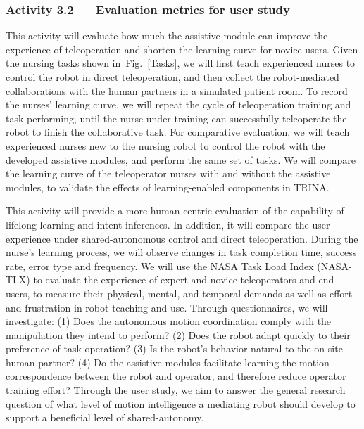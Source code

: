 \documentclass[letterpaper, 11 pt, onecolumn]{article}
\newcommand{\fig}[1]{Fig.~\ref{#1}}
\begin{document}
\subsubsection{Activity 3.2 --- Evaluation metrics for user study}\label{sec:plan-implementation-userstudy}
This activity will evaluate how much the assistive module can improve the experience of teleoperation and shorten the learning curve for novice users. Given the nursing tasks shown in~\fig{Tasks}, we will first teach experienced nurses to control the robot in direct teleoperation, and then collect the robot-mediated collaborations with the human partners in a simulated patient room. To record the nurses' learning curve, we will repeat the cycle of teleoperation training and task performing, until the nurse under training can successfully teleoperate the robot to finish the collaborative task. For comparative evaluation, we will teach experienced nurses new to the nursing robot to control the robot with the developed assistive modules, and perform the same set of tasks. We will compare the learning curve of the teleoperator nurses with and without the assistive modules, to validate the effects of learning-enabled components in TRINA. 

This activity will provide a more human-centric evaluation of the capability of lifelong learning and intent inferences. In addition, it will compare the user experience under shared-autonomous control and direct teleoperation. During the nurse's learning process, we will observe changes in task completion time, success rate, error type and frequency. We will use the NASA Task Load Index (NASA-TLX) to evaluate the experience of expert and novice teleoperators and end users, to measure their physical, mental, and temporal demands as well as effort and frustration in robot teaching and use. Through questionnaires, we will investigate: (1) Does the autonomous motion coordination comply with the manipulation they intend to perform? (2) Does the robot adapt quickly to their preference of task operation? (3) Is the robot's behavior natural to the on-site human partner? (4) Do the assistive modules facilitate learning the motion correspondence between the robot and operator, and therefore reduce operator training effort? Through the user study, we aim to answer the general research question of what level of motion intelligence a mediating robot should develop to support a beneficial level of shared-autonomy.
\end{document}
